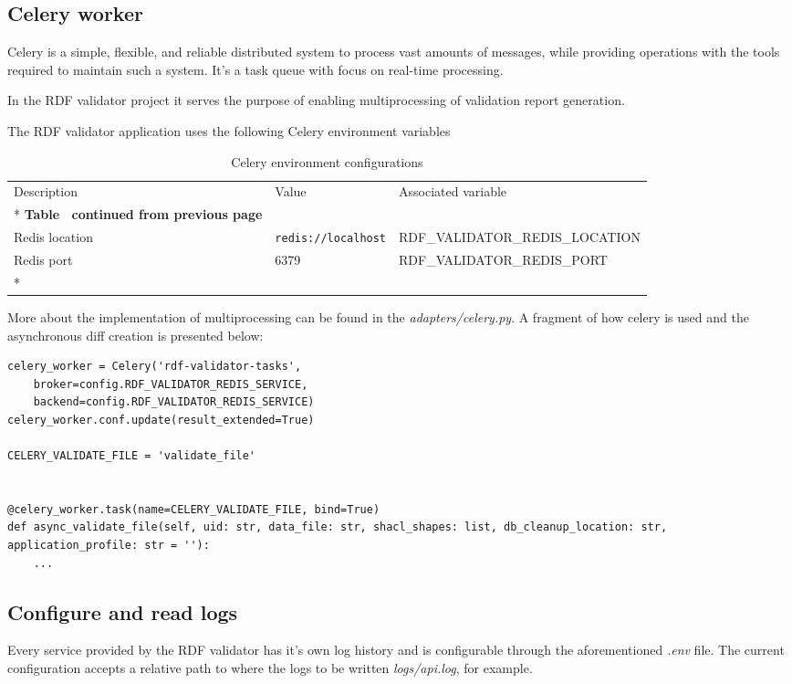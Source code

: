 \subsection{Celery worker}
Celery is a simple, flexible, and reliable distributed system to process vast amounts of messages, while providing operations with the tools required to maintain such a system. It’s a task queue with focus on real-time processing.

In the RDF validator project it serves the purpose of enabling multiprocessing of validation report generation.

The RDF validator application uses the following Celery environment variables

\begin{longtable}[c]{@{}p{3.5cm}p{3.5cm}l@{}}
	\toprule
	Description    & Value                      & Associated variable             \\* \midrule
	\endfirsthead
	\multicolumn{3}{c}%
	{{\bfseries Table \thetable\ continued from previous page}}                   \\
	\endhead
	\bottomrule
	\endfoot
	\endlastfoot
	Redis location & \texttt{redis://localhost} & RDF\_VALIDATOR\_REDIS\_LOCATION \\
	Redis port     & 6379                       & RDF\_VALIDATOR\_REDIS\_PORT     \\*\bottomrule
	\caption{Celery environment configurations}
	\label{tab:validator-celery-env}                                              \\
\end{longtable}

More about the implementation of multiprocessing can be found in the \textit{adapters/celery.py}. A fragment of how celery is used and the asynchronous diff creation is presented below:

\begin{lstlisting}
celery_worker = Celery('rdf-validator-tasks',
	broker=config.RDF_VALIDATOR_REDIS_SERVICE,
	backend=config.RDF_VALIDATOR_REDIS_SERVICE)
celery_worker.conf.update(result_extended=True)

CELERY_VALIDATE_FILE = 'validate_file'


@celery_worker.task(name=CELERY_VALIDATE_FILE, bind=True)
def async_validate_file(self, uid: str, data_file: str, shacl_shapes: list, db_cleanup_location: str, application_profile: str = ''):
	...
\end{lstlisting}

\subsection{Configure and read logs}
Every service provided by the RDF validator has it's own log history and is configurable through the aforementioned \textit{.env} file. The current configuration accepts a relative path to where the logs to be written \textit{logs/api.log}, for example.

